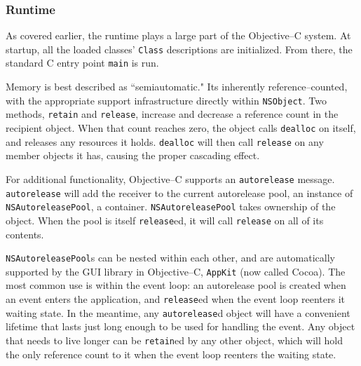 
\subsubsection{Runtime}
	As covered earlier, the runtime plays a large part of the Objective--C system.  At startup, all the loaded classes' \texttt{Class} descriptions are initialized.  From there, the standard C entry point \texttt{main} is run.  

	Memory is best described as ``semiautomatic."  Its inherently reference--counted, with the appropriate support infrastructure directly within \texttt{NSObject}.  Two methods, \texttt{retain} and \texttt{release}, increase and decrease a reference count in the recipient object.  When that count reaches zero, the object calls \texttt{dealloc} on itself, and releases any resources it holds.  \texttt{dealloc} will then call \texttt{release} on any member objects it has, causing the proper cascading effect.

	For additional functionality, Obj\-ect\-ive--C supports an \texttt{aut\-or\-el\-ease} message.  \texttt{autorelease} will add the receiver to the current autorelease pool, an instance of \texttt{NSAutoreleasePool}, a container.  \texttt{NSAutoreleasePool} takes ownership of the object.  When the pool is itself \texttt{release}ed, it will call \texttt{release} on all of its contents.

	\texttt{NSAutoreleasePool}s can be nested within each other, and are automatically supported by the GUI library in Objective--C, \texttt{AppKit} (now called Cocoa\cite{cocoa}).  The most common use is within the event loop: an autorelease pool is created when an event enters the application, and \texttt{release}ed when the event loop reenters it waiting state.  In the meantime, any \texttt{autorelease}d object will have a convenient lifetime that lasts just long enough to be used for handling the event.  Any object that needs to live longer can be \texttt{retain}ed by any other object, which will hold the only reference count to it when the event loop reenters the waiting state.

